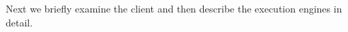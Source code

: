 Next we briefly examine the \SeeDB client and then describe the execution engines
in detail.


% 


